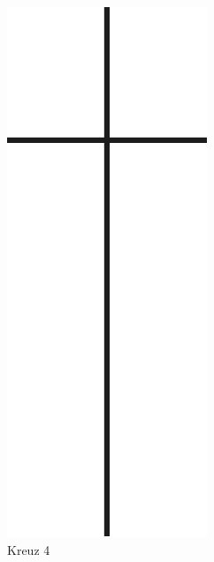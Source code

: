 \documentclass[ngerman,a4paper,11pt]{scrreprt}
\begin{document}
\begin{figure}[H]
\centering
\includegraphics[width=\textwidth,height=.8\textheight,keepaspectratio]{Bilder/Bilder/750_0010_18755_Todesanzeigen_Kreuz.png}
\caption{\label{img_Kreuz_4}Kreuz 4}
\end{figure}
\end{document}
